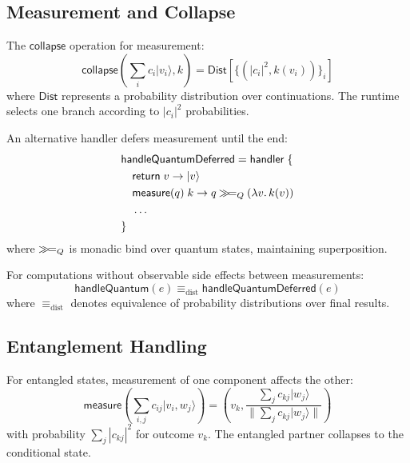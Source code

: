 \subsection{Measurement and Collapse}
\label{subsec:measurement-collapse}

\begin{definition}
\label{def:collapse-semantics}
The $\mathsf{collapse}$ operation for measurement:
\[
\mathsf{collapse}\left(\sum_i c_i |v_i\rangle, k\right) = \mathsf{Dist}\left[\{(|c_i|^2, k(v_i))\}_i\right]
\]
where $\mathsf{Dist}$ represents a probability distribution over continuations. The runtime selects one branch according to $|c_i|^2$ probabilities.
\end{definition}

\begin{definition}
\label{def:deferred-measurement}
An alternative handler defers measurement until the end:
\begin{align}
&\mathsf{handleQuantumDeferred} = \mathsf{handler}\; \{ \\
&\quad \mathsf{return}\; v \to |v\rangle \\
&\quad \mathsf{measure}(q)\; k \to q \mathbin{\gg\!=}_Q (\lambda v.\, k(v)) \\
&\quad \ldots \\
&\}
\end{align}
where $\mathbin{\gg\!=}_Q$ is monadic bind over quantum states, maintaining superposition.
\end{definition}

\begin{proposition}
\label{prop:measurement-defer}
For computations without observable side effects between measurements:
\[
\mathsf{handleQuantum}(e) \equiv_{\mathrm{dist}} \mathsf{handleQuantumDeferred}(e)
\]
where $\equiv_{\mathrm{dist}}$ denotes equivalence of probability distributions over final results.
\end{proposition}

\subsection{Entanglement Handling}
\label{subsec:entanglement-handling}

\begin{definition}
\label{def:entangle-semantics}
For entangled states, measurement of one component affects the other:
\[
\mathsf{measure}\left(\sum_{i,j} c_{ij} |v_i, w_j\rangle\right) = \left(v_k, \frac{\sum_j c_{kj} |w_j\rangle}{\|\sum_j c_{kj} |w_j\rangle\|}\right)
\]
with probability $\sum_j |c_{kj}|^2$ for outcome $v_k$. The entangled partner collapses to the conditional state.
\end{definition}


